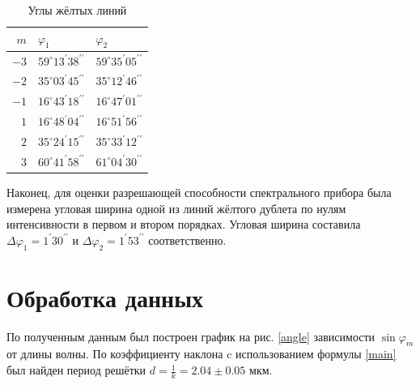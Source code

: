 \begin{table}[H]
    \centering
    \begin{tabular}{|r|p{4cm}|p{4cm}|}
    \hline $m$ & $\varphi_{1}$ & $\varphi_{2}$ \\ \hline
$-3$  & $59^{\circ} 13^{\prime} 38^{\prime \prime}$  & $59^{\circ} 35^{\prime} 05^{\prime \prime}$  \\ \hline
$-2$  & $35^{\circ} 03^{\prime} 45^{\prime \prime}$  & $35^{\circ} 12^{\prime} 46^{\prime \prime}$  \\ \hline
$-1$  & $16^{\circ} 43^{\prime} 18^{\prime \prime}$  & $16^{\circ} 47^{\prime} 01^{\prime \prime}$  \\ \hline
$1$   & $16^{\circ} 48^{\prime} 04^{\prime \prime}$  & $16^{\circ} 51^{\prime} 56^{\prime \prime}$  \\ \hline
$2$   & $35^{\circ} 24^{\prime} 15^{\prime \prime}$  & $35^{\circ} 33^{\prime} 12^{\prime \prime}$  \\ \hline
$3$   & $60^{\circ} 41^{\prime} 58^{\prime \prime}$  & $61^{\circ} 04^{\prime}  30^{\prime \prime}$  \\ \hline
    \end{tabular}
    \caption{Углы жёлтых линий}
    \label{yell}
\end{table}
\n
Наконец, для оценки разрешающей способности спектрального прибора была измерена угловая ширина одной из линий жёлтого дублета по нулям интенсивности в первом и втором порядках. Угловая ширина составила $\Delta \varphi_1 = 1^{\prime}  30^{\prime \prime}$ и $ \Delta \varphi_2 = 1^{\prime}  53^{\prime \prime}$ соответственно.

\section*{Обработка данных}

По полученным данным был построен график на рис. \ref{angle} зависимости $\sin \varphi_m$ от длины волны. По коэффициенту наклона c использованием формулы \eqref{main} был найден период решётки $d = \frac{1}{k} = 2.04 \pm 0.05$ мкм.

